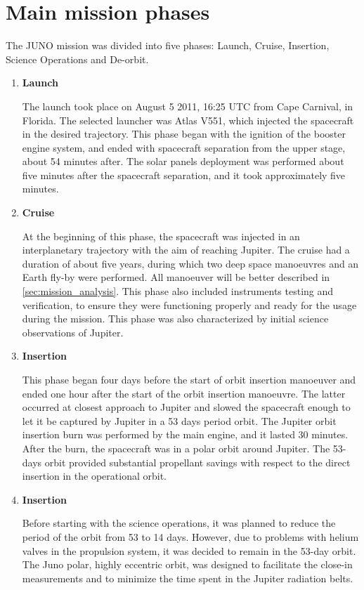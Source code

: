 \section{Main mission phases}
\label{sec:phases}

The JUNO mission was divided into five phases: Launch, Cruise, Insertion, Science Operations and De-orbit.
\begin{enumerate}
    \item \textbf{Launch} 
    

    The launch took place on August 5 2011, 16:25 UTC from Cape Carnival, in Florida. The selected launcher was Atlas V551, which injected the spacecraft in the desired trajectory.
    This phase began with the ignition of the booster engine system, and ended with spacecraft separation from the upper stage, about 54 minutes after. The solar panels deployment was performed about five minutes after the spacecraft separation, and it took approximately five minutes.

    \item \textbf{Cruise}
    
    At the beginning of this phase, the spacecraft was injected in an interplanetary trajectory with the aim of reaching Jupiter. The cruise had a duration of about five years, during which two deep space manoeuvres and an Earth fly-by were performed.
    All manoeuver will be better described in \autoref{sec:mission_analysis}. This phase also included instruments testing and verification, to ensure they were functioning properly and ready for the usage during the mission. This phase was also characterized by initial science observations of Jupiter.

    \item \textbf{Insertion}
    
    This phase began four days before the start of orbit insertion manoeuver and ended one hour after the start of the orbit insertion manoeuvre. The latter occurred at closest approach to Jupiter and slowed the spacecraft enough to let it be captured by Jupiter in a 53 days period orbit.
    The Jupiter orbit insertion burn was performed by the main engine, and it lasted 30 minutes. After the burn, the spacecraft was in a polar orbit around Jupiter.
    The 53-days orbit provided substantial propellant savings with respect to the direct insertion in the operational orbit.

    \item \textbf{Insertion}
    
    Before starting with the science operations, it was planned to reduce the period of the orbit from 53 to 14 days.
    However, due to problems with helium valves in the propulsion system, it was decided to remain in the 53-day orbit. The Juno polar, highly eccentric orbit, was designed to facilitate the close-in measurements and to minimize the time spent in the Jupiter radiation belts.


\end{enumerate}
